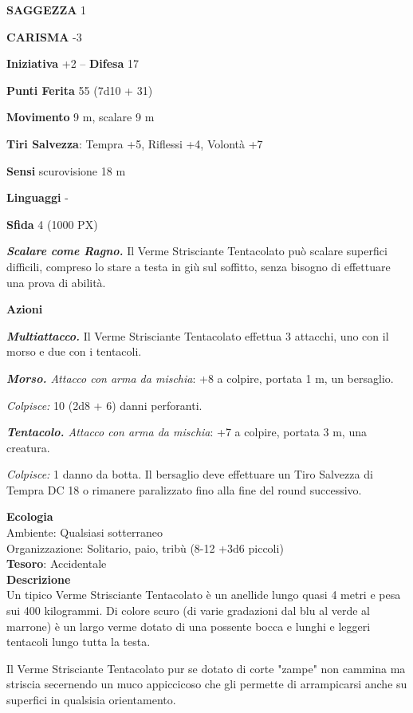 \begin{multicols}{2}
	\textbf{SAGGEZZA} 1

	\textbf{CARISMA} -3

	\textbf{Iniziativa} +2 -- \textbf{Difesa} 17

	\textbf{Punti Ferita} 55 (7d10 + 31)

	\textbf{Movimento} 9 m, scalare 9 m

	\textbf{Tiri Salvezza}: Tempra +5, Riflessi +4, Volontà +7

	\textbf{Sensi} scurovisione 18 m

	\textbf{Linguaggi} -

	\textbf{Sfida} 4 (1000 PX)

	\textit{\textbf{Scalare come Ragno.}} Il Verme Strisciante Tentacolato può scalare superfici difficili, compreso lo stare a testa in giù sul soffitto, senza bisogno di effettuare una prova di abilità.

	\textbf{Azioni}

	\textit{\textbf{Multiattacco.}} Il Verme Strisciante Tentacolato effettua 3 attacchi, uno con il morso e due con i tentacoli.

	\textit{\textbf{Morso.} Attacco con arma da mischia}: +8 a colpire, portata 1 m, un bersaglio.

	\textit{Colpisce:} 10 (2d8 + 6) danni perforanti.

	\textit{\textbf{Tentacolo.} Attacco con arma da mischia}: +7 a colpire, portata 3 m, una creatura.

	\textit{Colpisce:} 1 danno da botta. Il bersaglio deve effettuare un Tiro Salvezza di Tempra DC 18 o rimanere paralizzato fino alla fine del round successivo.

	\textbf{Ecologia}\\
	Ambiente: Qualsiasi sotterraneo\\
	Organizzazione: Solitario, paio, tribù (8-12 +3d6 piccoli)\\
	\textbf{Tesoro}: Accidentale\\
	\textbf{Descrizione}\\

	Un tipico Verme Strisciante Tentacolato è un anellide lungo quasi 4 metri e pesa sui 400 kilogrammi. Di colore scuro (di varie gradazioni dal blu al verde al marrone) è un largo verme dotato di una possente bocca e lunghi e leggeri tentacoli lungo tutta la testa.

	Il Verme Strisciante Tentacolato pur se dotato di corte "zampe" non cammina ma striscia secernendo un muco appiccicoso che gli permette di arrampicarsi anche su superfici in qualsisia orientamento.


\end{multicols}
